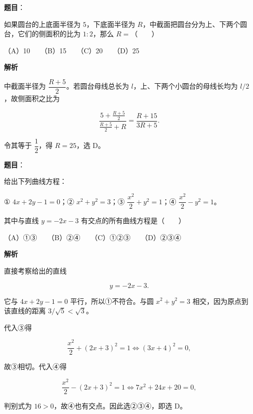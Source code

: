 \begin{answer}

\textbf{题目}：

如果圆台的上底面半径为 $5$，下底面半径为 $R$，中截面把圆台分为上、下两个圆台，它们的侧面积的比为 $1:2$，那么 $R=$\mbox{（　　）}

（A）10　　（B）15　　（C）20　　（D）25

\textbf{解析}

中截面半径为 $\dfrac{R+5}{2}$。若圆台母线总长为 $l$，上、下两个小圆台的母线长均为 $l/2$，故侧面积之比为

\nopagebreak[4]
\[
\frac{5+\frac{R+5}{2}}{\frac{R+5}{2}+R}
=\frac{R+15}{3R+5}.
\]

令其等于 $\dfrac12$，得 $R=25$，选 D。


\end{answer}
\begin{answer}

\textbf{题目}：

给出下列曲线方程：

① $4x+2y-1=0$；② $x^2+y^2=3$；③ $\dfrac{x^2}{2}+y^2=1$；④ $\dfrac{x^2}{2}-y^2=1$。

其中与直线 $y=-2x-3$ 有交点的所有曲线方程是\mbox{（　　）}

（A）①③　　（B）②④　　（C）①②③　　（D）②③④

\textbf{解析}

直接考察给出的直线

\nopagebreak[4]
\[
y=-2x-3.
\]

它与 $4x+2y-1=0$ 平行，所以①不符合。与圆 $x^2+y^2=3$ 相交，因为原点到该直线的距离 $3/\sqrt5<\sqrt3$。

代入③得

\nopagebreak[4]
\[
\frac{x^2}{2}+(2x+3)^2=1
\Longleftrightarrow
(3x+4)^2=0,
\]

故③相切。代入④得

\nopagebreak[4]
\[
\frac{x^2}{2}-(2x+3)^2=1
\Longleftrightarrow
7x^2+24x+20=0,
\]

判别式为 $16>0$，故④也有交点。因此选②③④，即选 D。


\end{answer}
